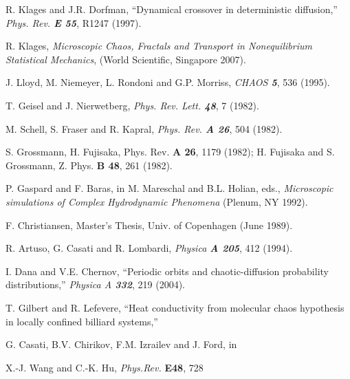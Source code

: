  R. Klages and J.R. Dorfman,
	``Dynamical crossover in deterministic diffusion,''
	{\em Phys. Rev. \bf E 55}, R1247 (1997). %


 R. Klages,
    {\em Microscopic Chaos, Fractals and Transport
     in Nonequilibrium Statistical Mechanics},
     (World Scientific, Singapore 2007).

  J. Lloyd, M. Niemeyer, L. Rondoni and G.P. Morriss,
	{\em CHAOS \bf  5}, 536 (1995).

 T. Geisel and J. Nierwetberg,
	{\em Phys. Rev. Lett. \bf 48}, 7 (1982).

 M. Schell, S. Fraser and R. Kapral,
	{\em Phys. Rev. \bf A 26}, 504 (1982).

 S. Grossmann, H. Fujisaka,
	{Phys. Rev. \bf A 26}, 1179 (1982);
	H. Fujisaka and S. Grossmann, {Z. Phys. \bf B 48}, 261 (1982).

 P. Gaspard and F. Baras, in
	M. Mareschal and B.L. Holian, eds.,
	{\em Microscopic simulations of Complex Hydrodynamic
	Phenomena} (Plenum, NY 1992).

 F. Christiansen, Master's Thesis, Univ.
        of Copenhagen (June 1989).

 R. Artuso, G. Casati and R. Lombardi,
	  {\em Physica \bf A 205}, 412  (1994).

 I. Dana and V.E. Chernov,
	``Periodic orbits and chaotic-diffusion
	 probability distributions,''
	{\em Physica A \bf 332}, 219 (2004). %


 T. Gilbert  and R. Lefevere,
    ``Heat conductivity from molecular chaos hypothesis
             in locally confined billiard systems,''

 G. Casati, B.V. Chirikov, F.M. Izrailev and J. Ford, in

 X.-J. Wang and C.-K. Hu, {\em Phys.Rev.} {\bf E48}, 728

